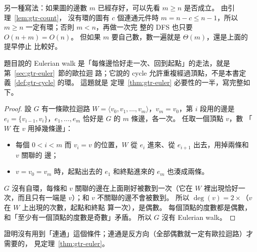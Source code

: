 另一種寫法：如果圖的邊數 $m$ 已經存好，可以先看 $m \ge n$ 是否成立。 由引理~\ref{lem:gtr-count}，
沒有環的圖有 $c$ 個連通元件時 $m = n - c \le n - 1$，所以 $m \ge n$ 一定有環；否則 $m < n$，再做一次完
整的 DFS 也只要 $O(n + m) = O(n)$。 但如果 $m$ 要自己數，數一遍就是 $\Theta(m)$，還是上面的提早停止
比較好。

題目說的 Eulerian walk 是「每條邊恰好走一次、回到起點」的走法，就是第~\ref{sec:gtr-euler}~節的歐拉迴
路；它說的 cycle 允許重複經過頂點，不是本書定義~\ref{def:gtr-cycle} 的環。 這題就是
定理~\ref{thm:gtr-euler} 必要性的一半，寫完整如下。

\begin{proof}
設 $G$ 有一條歐拉迴路 $W = \langle v_0, v_1, \ldots, v_m \rangle$，$v_m = v_0$，第 $i$ 段用的邊是
$e_i = \{v_{i-1}, v_i\}$，$e_1, \ldots, e_m$ 恰好是 $G$ 的 $m$ 條邊，各一次。 任取一個頂點 $v$，數
「$W$ 在 $v$ 用掉幾條邊」：
\begin{itemize}
\item 每個 $0 < i < m$ 而 $v_i = v$ 的位置，$W$ 從 $e_i$ 進來、從 $e_{i+1}$ 出去，用掉兩條和 $v$ 關聯的
邊；
\item $v = v_0 = v_m$ 時，起點出去的 $e_1$ 和終點進來的 $e_m$ 也湊成兩條。
\end{itemize}
$G$ 沒有自環，每條和 $v$ 關聯的邊在上面剛好被數到一次（它在 $W$ 裡出現恰好一次，而且只有一端是
$v$）；和 $v$ 不關聯的邊不會被數到。 所以 $\deg(v) = 2 \times$（$v$ 在 $W$ 上出現的次數，起點和終點
算一次），是偶數。 每個頂點的度數都是偶數，和「至少有一個頂點的度數是奇數」矛盾。 所以 $G$ 沒有
Eulerian walk。
\end{proof}

證明沒有用到「連通」這個條件；連通是反方向（全部偶數就一定有歐拉迴路）才需要的，
見定理~\ref{thm:gtr-euler}。
